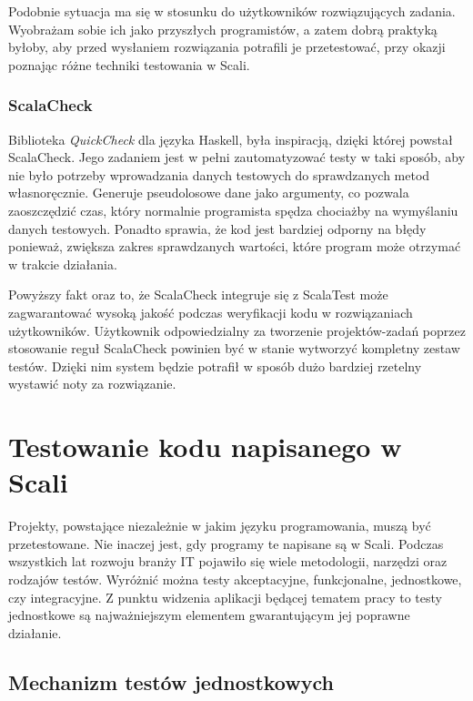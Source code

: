 \documentclass[brudnopis]{xmgr}
\begin{document}
Podobnie sytuacja ma się w stosunku do użytkowników rozwiązujących zadania. Wyobrażam sobie ich jako przyszłych programistów, a zatem dobrą praktyką byłoby, aby przed wysłaniem rozwiązania potrafili je przetestować, przy okazji poznając różne techniki testowania w Scali. 

\subsection{ScalaCheck}

\label{scalaCheckSrodek}

Biblioteka \emph{QuickCheck} dla języka Haskell, była inspiracją, dzięki której powstał ScalaCheck. Jego zadaniem jest w pełni zautomatyzować testy w taki sposób, aby nie było potrzeby wprowadzania danych testowych do sprawdzanych metod własnoręcznie. Generuje pseudolosowe dane jako argumenty, co pozwala zaoszczędzić czas, który normalnie programista spędza chociażby na wymyślaniu danych testowych. Ponadto sprawia, że kod jest bardziej odporny na błędy ponieważ, zwiększa zakres sprawdzanych wartości, które program może otrzymać w trakcie działania.

Powyższy fakt oraz to, że ScalaCheck integruje się z ScalaTest może zagwarantować wysoką jakość podczas weryfikacji kodu w rozwiązaniach użytkowników. Użytkownik odpowiedzialny za tworzenie projektów-zadań poprzez stosowanie reguł ScalaCheck powinien być w stanie wytworzyć kompletny zestaw testów. Dzięki nim system będzie potrafił w sposób dużo bardziej rzetelny wystawić noty za rozwiązanie.
      
\chapter{Testowanie kodu napisanego w Scali}      

Projekty, powstające niezależnie w jakim języku programowania, muszą być przetestowane. Nie inaczej jest, gdy programy te napisane są w Scali. Podczas wszystkich lat rozwoju branży IT pojawiło się wiele metodologii, narzędzi oraz rodzajów testów. Wyróżnić można testy akceptacyjne, funkcjonalne, jednostkowe, czy integracyjne. Z punktu widzenia aplikacji będącej tematem pracy to testy jednostkowe są najważniejszym elementem gwarantującym jej poprawne działanie.       
      
\section{Mechanizm testów jednostkowych}
\end{document}
